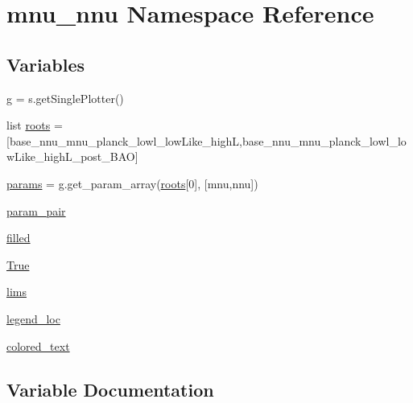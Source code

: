 \hypertarget{namespacemnu__nnu}{}\section{mnu\+\_\+nnu Namespace Reference}
\label{namespacemnu__nnu}
\subsection*{Variables}
\begin{DoxyCompactItemize}
\item 
\mbox{\hyperlink{namespacemnu__nnu_ad7f12485f7a5a20ec4c28b0d6cdd1443}{g}} = s.\+get\+Single\+Plotter()
\item 
list \mbox{\hyperlink{namespacemnu__nnu_a4416420354c9eab25c0721d55acdf3f3}{roots}} = \mbox{[}\textquotesingle{}base\+\_\+nnu\+\_\+mnu\+\_\+planck\+\_\+lowl\+\_\+low\+Like\+\_\+highL\textquotesingle{},\textquotesingle{}base\+\_\+nnu\+\_\+mnu\+\_\+planck\+\_\+lowl\+\_\+low\+Like\+\_\+high\+L\+\_\+post\+\_\+\+B\+AO\textquotesingle{}\mbox{]}
\item 
\mbox{\hyperlink{namespacemnu__nnu_adbdcccec642b041e02a8ec6dc95c2040}{params}} = g.\+get\+\_\+param\+\_\+array(\mbox{\hyperlink{namespacemnu__nnu_a4416420354c9eab25c0721d55acdf3f3}{roots}}\mbox{[}0\mbox{]}, \mbox{[}\textquotesingle{}mnu\textquotesingle{},\textquotesingle{}nnu\textquotesingle{}\mbox{]})
\item 
\mbox{\hyperlink{namespacemnu__nnu_a632ccb96a746fc535cbf3dd806fd73a9}{param\+\_\+pair}}
\item 
\mbox{\hyperlink{namespacemnu__nnu_a03e3b33caef607cf4826a015346ea974}{filled}}
\item 
\mbox{\hyperlink{namespacemnu__nnu_a39d57732eb79cf06749e8e0ab7b49f2b}{True}}
\item 
\mbox{\hyperlink{namespacemnu__nnu_aa4543e4cb687ecf2e5dff72da3929675}{lims}}
\item 
\mbox{\hyperlink{namespacemnu__nnu_a3298070489ac2ab2afacee861f8e0ce2}{legend\+\_\+loc}}
\item 
\mbox{\hyperlink{namespacemnu__nnu_ae98db5aaaed8340f6ef6ee13521bb7fc}{colored\+\_\+text}}
\end{DoxyCompactItemize}


\subsection{Variable Documentation}
\mbox{\label{namespacemnu__nnu_ae98db5aaaed8340f6ef6ee13521bb7fc}} 
